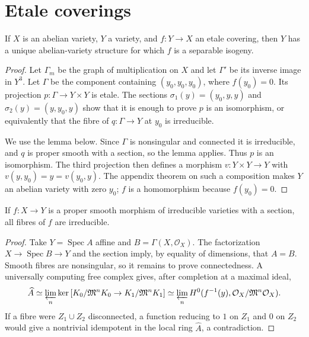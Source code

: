 
\section{Etale coverings}
\label{mumford-IV18-source}

\begin{theorem}
\label{mumford-thm-etale-cover-abelian-structure}
If $X$ is an abelian variety, $Y$ a variety, and $f:Y\to X$ an etale
covering, then $Y$ has a unique abelian-variety structure for which $f$ is
a separable isogeny.
\end{theorem}
\begin{proof}
Let $\Gamma_m$ be the graph of multiplication on $X$ and let $\Gamma'$ be
its inverse image in $Y^3$. Let $\Gamma$ be the component containing
$(y_0,y_0,y_0)$, where $f(y_0)=0$. Its projection
$p:\Gamma\to Y\times Y$ is etale. The sections
$\sigma_1(y)=(y_0,y,y)$ and $\sigma_2(y)=(y,y_0,y)$ show that it is enough
to prove $p$ is an isomorphism, or equivalently that the fibre of
$q:\Gamma\to Y$ at $y_0$ is irreducible.

We use the lemma below. Since $\Gamma$ is nonsingular and connected it is
irreducible, and $q$ is proper smooth with a section, so the lemma applies.
Thus $p$ is an isomorphism. The third projection then defines a morphism
$v:Y\times Y\to Y$ with $v(y,y_0)=y=v(y_0,y)$. The appendix theorem on
such a composition makes $Y$ an abelian variety with zero $y_0$; $f$ is a
homomorphism because $f(y_0)=0$.
\end{proof}

\begin{lemma}
\label{mumford-lem-etale-cover-graph}
If $f:X\to Y$ is a proper smooth morphism of irreducible varieties with a
section, all fibres of $f$ are irreducible.
\end{lemma}
\begin{proof}
Take $Y=\operatorname{Spec}A$ affine and $B=\Gamma(X,\mathcal O_X)$.
The factorization $X\to\operatorname{Spec}B\to Y$ and the section imply,
by equality of dimensions, that $A=B$. Smooth fibres are nonsingular, so it
remains to prove connectedness. A universally computing free complex gives,
after completion at a maximal ideal,
\[
\widehat A\simeq\varprojlim_n\ker\left[
 K_0/\mathfrak M^nK_0\to K_1/\mathfrak M^nK_1\right]
\simeq\varprojlim_n H^0(f^{-1}(y),\mathcal O_X/\mathfrak M^n\mathcal O_X).
\]
If a fibre were $Z_1\cup Z_2$ disconnected, a function reducing to $1$ on
$Z_1$ and $0$ on $Z_2$ would give a nontrivial idempotent in the local ring
$\widehat A$, a contradiction.
\end{proof}

